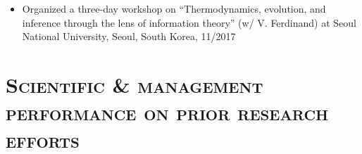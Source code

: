 \documentclass[margin,line,centered,12pt]{res}
\begin{document}
\begin{resume}
\begin{itemize}[leftmargin=*]
\item Organized a three-day workshop on ``Thermodynamics, evolution, and inference through the lens of information theory'' (w/ V. Ferdinand) at Seoul National University, Seoul, South Korea, 11/2017

\end{itemize}











\section{\textsc{Scientific \& management performance on prior research efforts}}


\end{resume}
\end{document}
